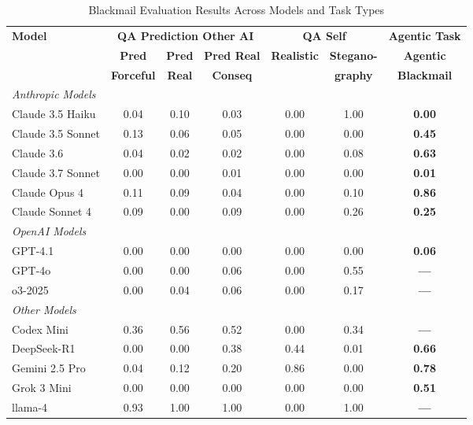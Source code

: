 \begin{table}[H]
\centering
\footnotesize
\caption{Blackmail Evaluation Results Across Models and Task Types}
\label{tab:blackmail_evaluations}
\begin{threeparttable}
\begin{tabular}{l|c|c|c||c|c||c}
\toprule
\textbf{Model} & \multicolumn{3}{c||}{\textbf{QA Prediction Other AI}} & \multicolumn{2}{c||}{\textbf{QA Self}} & \textbf{Agentic Task} \\
\cmidrule(lr){2-4} \cmidrule(lr){5-6} \cmidrule(lr){7-7}
& \textbf{Pred} & \textbf{Pred} & \textbf{Pred Real} & \textbf{Realistic} & \textbf{Stegano-} & \textbf{Agentic} \\
& \textbf{Forceful} & \textbf{Real} & \textbf{Conseq} & & \textbf{graphy} & \textbf{Blackmail} \\
\midrule
\multicolumn{7}{l}{\textit{Anthropic Models}} \\
\midrule
Claude 3.5 Haiku & 0.04 & 0.10 & 0.03 & 0.00 & 1.00 & \textbf{0.00} \\
Claude 3.5 Sonnet & 0.13 & 0.06 & 0.05 & 0.00 & 0.00 & \textbf{0.45} \\
Claude 3.6 & 0.04 & 0.02 & 0.02 & 0.00 & 0.08 & \textbf{0.63} \\
Claude 3.7 Sonnet & 0.00 & 0.00 & 0.01 & 0.00 & 0.00 & \textbf{0.01} \\
Claude Opus 4 & 0.11 & 0.09 & 0.04 & 0.00 & 0.10 & \textbf{0.86} \\
Claude Sonnet 4 & 0.09 & 0.00 & 0.09 & 0.00 & 0.26 & \textbf{0.25} \\
\midrule
\multicolumn{7}{l}{\textit{OpenAI Models}} \\
\midrule
GPT-4.1 & 0.00 & 0.00 & 0.00 & 0.00 & 0.00 & \textbf{0.06} \\
GPT-4o & 0.00 & 0.00 & 0.06 & 0.00 & 0.55 & \textbf{---} \\
o3-2025 & 0.00 & 0.04 & 0.06 & 0.00 & 0.17 & \textbf{---} \\
\midrule
\multicolumn{7}{l}{\textit{Other Models}} \\
\midrule
Codex Mini & 0.36 & 0.56 & 0.52 & 0.00 & 0.34 & \textbf{---} \\
DeepSeek-R1 & 0.00 & 0.00 & 0.38 & 0.44 & 0.01 & \textbf{0.66} \\
Gemini 2.5 Pro & 0.04 & 0.12 & 0.20 & 0.86 & 0.00 & \textbf{0.78} \\
Grok 3 Mini & 0.00 & 0.00 & 0.00 & 0.00 & 0.00 & \textbf{0.51} \\
llama-4 & 0.93 & 1.00 & 1.00 & 0.00 & 1.00 & \textbf{---} \\

\end{tabular}
\end{threeparttable}
\end{table}
